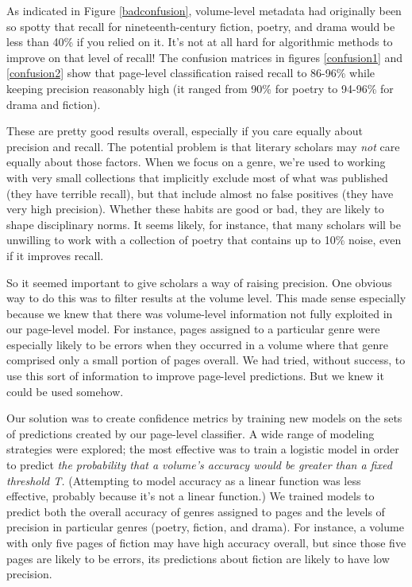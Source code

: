 \documentclass[paper=a4, fontsize=12pt]{scrartcl}
\numberwithin{equation}{section}		%
\numberwithin{figure}{section}			%
\numberwithin{table}{section}				%
\begin{document}
As indicated in Figure \ref{badconfusion}, volume-level metadata had originally been so spotty that recall for nineteenth-century fiction, poetry, and drama would be less than 40\% if you relied on it. It's not at all hard for algorithmic methods to improve on that level of recall! The confusion matrices in figures \ref{confusion1} and \ref{confusion2} show that page-level classification raised recall to 86-96\% while keeping precision reasonably high (it ranged from 90\% for poetry to 94-96\% for drama and fiction).

These are pretty good results overall, especially if you care equally about precision and recall. The potential problem is that literary scholars may \textit{not} care equally about those factors. When we focus on a genre, we're used to working with very small collections that implicitly exclude most of what was published (they have terrible recall), but that include almost no false positives (they have very high precision). Whether these habits are good or bad, they are likely to shape disciplinary norms. It seems likely, for instance, that many scholars will be unwilling to work with a collection of poetry that contains up to 10\% noise, even if it improves recall.

So it seemed important to give scholars a way of raising precision. One obvious way to do this was to filter results at the volume level. This made sense especially because we knew that there was volume-level information not fully exploited in our page-level model. For instance, pages assigned to a particular genre were especially likely to be errors when they occurred in a volume where that genre comprised only a small portion of pages overall. We had tried, without success, to use this sort of information to improve page-level predictions. But we knew it could be used somehow.

Our solution was to create confidence metrics by training new models on the sets of predictions created by our page-level classifier. A wide range of modeling strategies were explored; the most effective was to train a logistic model in order to predict \textit{the probability that a volume's accuracy would be greater than a fixed threshold T.} (Attempting to model accuracy as a linear function was less effective, probably because it's not a linear function.) We trained models to predict both the overall accuracy of genres assigned to pages and the levels of precision in particular genres (poetry, fiction, and drama). For instance, a volume with only five pages of fiction may have high accuracy overall, but since those five pages are likely to be errors, its predictions about fiction are likely to have low precision.
\end{document}

